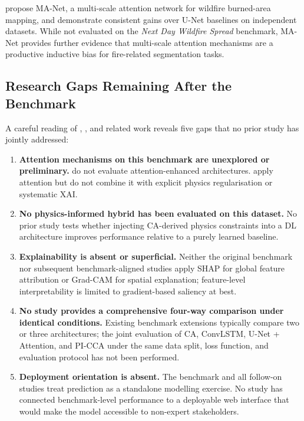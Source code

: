 \citet{zhang2024manet} propose MA-Net, a multi-scale attention network for wildfire burned-area mapping, and demonstrate consistent gains over U-Net baselines on independent datasets.
While not evaluated on the \textit{Next Day Wildfire Spread} benchmark, MA-Net provides further evidence that multi-scale attention mechanisms are a productive inductive bias for fire-related segmentation tasks.

\subsection{Research Gaps Remaining After the Benchmark}

A careful reading of \citet{huot2022next}, \citet{fitzgerald2023attention}, and related work reveals five gaps that no prior study has jointly addressed:

\begin{enumerate}
    \item \textbf{Attention mechanisms on this benchmark are unexplored or preliminary.}
          \citet{huot2022next} do not evaluate attention-enhanced architectures.
          \citet{fitzgerald2023attention} apply attention but do not combine it with explicit physics regularisation or systematic XAI.

    \item \textbf{No physics-informed hybrid has been evaluated on this dataset.}
          No prior study tests whether injecting CA-derived physics constraints into a DL architecture improves performance relative to a purely learned baseline.

    \item \textbf{Explainability is absent or superficial.}
          Neither the original benchmark nor subsequent benchmark-aligned studies apply SHAP for global feature attribution or Grad-CAM for spatial explanation; feature-level interpretability is limited to gradient-based saliency at best.

    \item \textbf{No study provides a comprehensive four-way comparison under identical conditions.}
          Existing benchmark extensions typically compare two or three architectures; the joint evaluation of CA, ConvLSTM, U-Net + Attention, and PI-CCA under the same data split, loss function, and evaluation protocol has not been performed.

    \item \textbf{Deployment orientation is absent.}
          The benchmark and all follow-on studies treat prediction as a standalone modelling exercise.
          No study has connected benchmark-level performance to a deployable web interface that would make the model accessible to non-expert stakeholders.
\end{enumerate}

